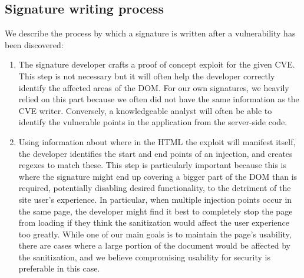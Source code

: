 \subsection{Signature writing process}
We describe the process by which a signature is written after a vulnerability has been discovered:
\begin{enumerate}
	\item{
The signature developer crafts a proof of concept exploit for the given CVE. This step is not necessary but it will often help the developer correctly identify the affected areas of the DOM. For our own signatures, we heavily relied on this part because we often did not have the same information as the CVE writer.
Conversely, a knowledgeable analyst will often be able to identify the vulnerable points in the application from the server-side code.}
\item
Using information about where in the HTML the exploit will manifest itself, the developer identifies the start and end points of an injection, and creates regexes to match these. This step is particularly important because this is where the signature might end up covering a bigger part of the DOM than is required, potentially disabling desired functionality, to the detriment of the site user's experience. In particular, when multiple injection points occur in the same page, the developer might find it best to completely stop the page from loading if they think the sanitization would affect the user experience too greatly. While one of our main goals is to maintain the page's usability, there are cases where a large portion of the document would be affected by the sanitization, and we believe compromising usability for security is preferable in this case.


\end{enumerate}

